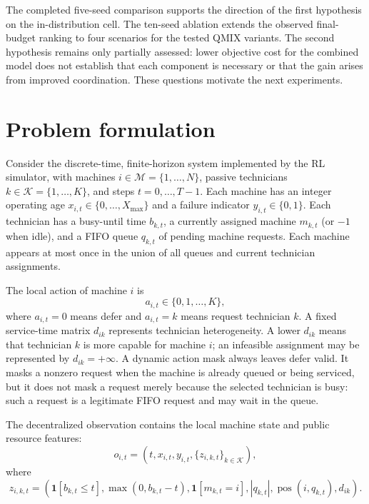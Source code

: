 \documentclass[11pt]{article}
\begin{document}
The completed five-seed comparison supports the direction of the first hypothesis on the in-distribution cell. The ten-seed ablation extends the observed final-budget ranking to four scenarios for the tested QMIX variants. The second hypothesis remains only partially assessed: lower objective cost for the combined model does not establish that each component is necessary or that the gain arises from improved coordination. These questions motivate the next experiments.

\section{Problem formulation}

Consider the discrete-time, finite-horizon system implemented by the RL simulator, with machines $i\in\mathcal{M}=\{1,\ldots,N\}$, passive technicians $k\in\mathcal{K}=\{1,\ldots,K\}$, and steps $t=0,\ldots,T-1$. Each machine has an integer operating age $x_{i,t}\in\{0,\ldots,X_{\max}\}$ and a failure indicator $y_{i,t}\in\{0,1\}$. Each technician has a busy-until time $b_{k,t}$, a currently assigned machine $m_{k,t}$ (or $-1$ when idle), and a FIFO queue $q_{k,t}$ of pending machine requests. Each machine appears at most once in the union of all queues and current technician assignments.

The local action of machine $i$ is
\begin{equation}
    a_{i,t}\in\{0,1,\ldots,K\},
\end{equation}
where $a_{i,t}=0$ means defer and $a_{i,t}=k$ means request technician $k$. A fixed service-time matrix $d_{ik}$ represents technician heterogeneity. A lower $d_{ik}$ means that technician $k$ is more capable for machine $i$; an infeasible assignment may be represented by $d_{ik}=+\infty$. A dynamic action mask always leaves defer valid. It masks a nonzero request when the machine is already queued or being serviced, but it does not mask a request merely because the selected technician is busy: such a request is a legitimate FIFO request and may wait in the queue.

The decentralized observation contains the local machine state and public resource features:
\begin{equation}
    o_{i,t}=\left(t,x_{i,t},y_{i,t},
    \{z_{i,k,t}\}_{k\in\mathcal{K}}\right),
\end{equation}
where
\begin{equation}
    z_{i,k,t}=\left(\mathbf{1}[b_{k,t}\leq t],
    \max(0,b_{k,t}-t),
    \mathbf{1}[m_{k,t}=i],
    |q_{k,t}|,
    \operatorname{pos}(i,q_{k,t}),
    d_{ik}\right).
\end{equation}
\end{document}
